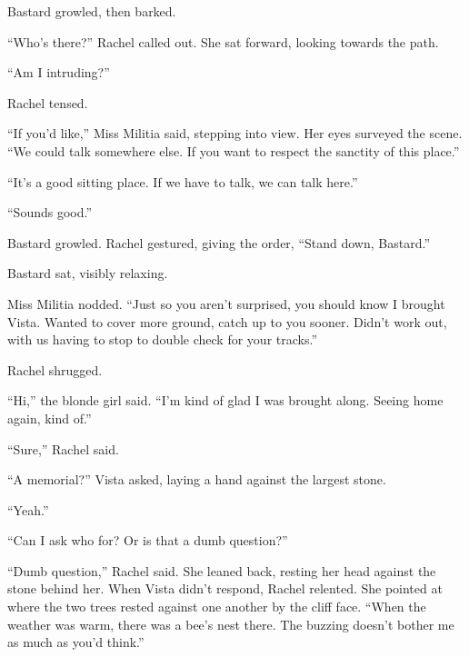 Bastard growled, then barked.



``Who's there?'' Rachel called out.  She sat forward, looking towards the path.



``Am I intruding?''



Rachel tensed.



``If you'd like,'' Miss Militia said, stepping into view.  Her eyes surveyed the scene.  ``We could talk somewhere else.  If you want to respect the sanctity of this place.''



``It's a good sitting place.  If we have to talk, we can talk here.''



``Sounds good.''



Bastard growled.  Rachel gestured, giving the order, ``Stand down, Bastard.''



Bastard sat, visibly relaxing.



Miss Militia nodded.  ``Just so you aren't surprised, you should know I brought Vista.  Wanted to cover more ground, catch up to you sooner.  Didn't work out, with us having to stop to double check for your tracks.''



Rachel shrugged.



``Hi,'' the blonde girl said.  ``I'm kind of glad I was brought along.  Seeing home again, kind of.''



``Sure,'' Rachel said.



``A memorial?'' Vista asked, laying a hand against the largest stone.



``Yeah.''



``Can I ask who for?  Or is that a dumb question?''



``Dumb question,'' Rachel said.  She leaned back, resting her head against the stone behind her.  When Vista didn't respond, Rachel relented.  She pointed at where the two trees rested against one another by the cliff face.  ``When the weather was warm, there was a bee's nest there.  The buzzing doesn't bother me as much as you'd think.''



